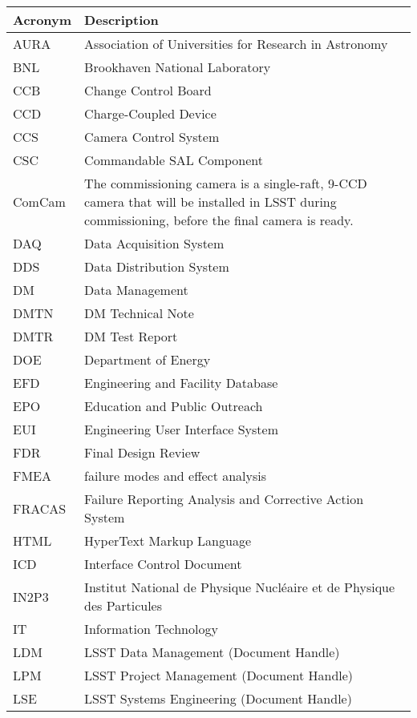\addtocounter{table}{-1}
\begin{longtable}{p{}p{}}\hline
\textbf{Acronym} & \textbf{Description}  \\\hline

AURA & Association of Universities for Research in Astronomy \\\hline
BNL & Brookhaven National Laboratory \\\hline
CCB & Change Control Board \\\hline
CCD & Charge-Coupled Device \\\hline
CCS & Camera Control System \\\hline
CSC & Commandable SAL Component \\\hline
ComCam & The commissioning camera is a single-raft, 9-CCD camera that will be installed in LSST during commissioning, before the final camera is ready. \\\hline
DAQ & Data Acquisition System \\\hline
DDS & Data Distribution System \\\hline
DM & Data Management \\\hline
DMTN & DM Technical Note \\\hline
DMTR & DM Test Report \\\hline
DOE & Department of Energy \\\hline
EFD & Engineering and Facility Database \\\hline
EPO & Education and Public Outreach \\\hline
EUI & Engineering User Interface System \\\hline
FDR & Final Design Review \\\hline
FMEA & failure modes and effect analysis \\\hline
FRACAS & Failure Reporting Analysis and Corrective Action System \\\hline
HTML & HyperText Markup Language \\\hline
ICD & Interface Control Document \\\hline
IN2P3 & Institut National de Physique Nucléaire et de Physique des Particules \\\hline
IT & Information Technology \\\hline
LDM & LSST Data Management (Document Handle) \\\hline
LPM & LSST Project Management (Document Handle) \\\hline
LSE & LSST Systems Engineering (Document Handle) \\\hline

\end{longtable}
